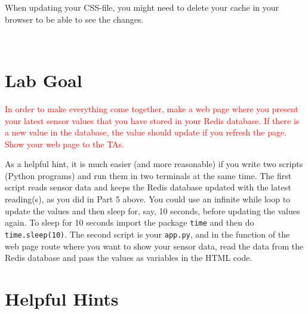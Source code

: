 \documentclass{article}
\begin{document}
\parbox[t]{14cm}{When updating your CSS-file, you might need to delete your cache in your browser to be able to see the changes.}\\



\section{Lab Goal}
\textcolor{red}{In order to make everything come together, make a web page where you present your latest sensor values that you have stored in your Redis database. If there is a new value in the database, the value should update if you refresh the page. Show your web page to the TAs.}

As a helpful hint, it is much easier (and more reasonable) if you write two scripts (Python programs) and run them in two terminals at the same time. The first script reads sensor data and keeps the Redis database updated with the latest reading(s), as you did in Part 5 above. You could use an infinite while loop to update the values and then sleep for, say, 10 seconds, before updating the values again. To sleep for 10 seconds import the package \texttt{time} and then do \texttt{time.sleep(10)}. The second script is your \verb!app.py!, and in the function of the web page route where you want to show your sensor data, read the data from the Redis database and pass the values as variables in the HTML code.






\section{Helpful Hints}
\end{document}
